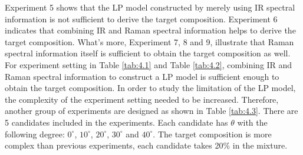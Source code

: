 \begin{table} \tiny 
{}
\caption{Experiment 5 to Experiment 9 setting for methionine candidates}
\label{tab:4.2}
\end{table}	

Experiment 5 shows that the LP model constructed by merely using IR spectral information is not sufficient to derive the target composition. Experiment 6 indicates that combining IR and Raman spectral information helps to derive the target composition. What's more, Experiment  7, 8 and 9, illustrate that Raman spectral information itself is sufficient to obtain the target composition as well. \\

For experiment setting in Table \ref{tab:4.1} and Table \ref{tab:4.2}, combining IR and Raman spectral information to construct a LP model is sufficient enough to obtain the target composition. In order to study the limitation of the LP model, the complexity of the experiment setting needed to be increased. Therefore, another group of experiments are designed as shown in Table \ref{tab:4.3}. There are 5 candidates included in the experiments. Each candidate has $\theta$ with the following degree: $0^{\circ}$, $10^{\circ}$, $20^{\circ}$, $30^{\circ}$ and $40^{\circ}$. The target composition is more complex than previous experiments, each candidate takes 20\% in the mixture. \\


